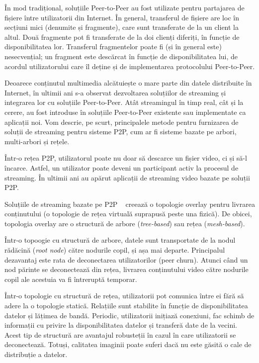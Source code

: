 În mod tradițional, soluțiile Peer-to-Peer au fost utilizate pentru partajarea
de fișiere între utilizatorii din Internet. În general, transferul de fișiere
are loc în secțiuni mici (denumite și fragmente), care sunt transferate de
la un client la altul. Două fragmente pot fi transferate de la doi clienți
diferiți, în funcție de disponibilitatea lor. Transferul fragmentelor poate fi
(și în general este) nesecvențial; un fragment este descărcat în funcție de
disponibilitatea lui, de acordul utilizatorului care îl deține și de
implementarea protocolului Peer-to-Peer.

Deoarece conținutul multimedia alcătuiește o mare parte din datele distribuite
în Internet, în ultimii ani s-a observat dezvoltarea soluțiilor de streaming
și integrarea lor cu soluțiile Peer-to-Peer. Atât streamingul în timp real,
cât și la cerere, au fost introduse în soluțiile Peer-to-Peer existente sau
implementate ca aplicații noi. Vom descrie, pe scurt, principalele metode
pentru furnizarea de soluții de streaming pentru sisteme P2P, cum ar fi
sisteme bazate pe arbori, multi-arbori și rețele.

Într-o rețea P2P, utilizatorul poate nu doar să descarce un fișier video,
ci și să-l încarce. Astfel, un utilizator poate deveni un participant activ
la procesul de streaming. În ultimii ani au apărut aplicații de streaming video
bazate pe soluții P2P.

Soluțiile de streaming bazate pe P2P ~\cite{p2p-streaming-survey} creează o
topologie overlay pentru livrarea conținutului (o topologie de rețea virtuală
suprapusă peste una fizică). De obicei, topologia overlay are o structură
de arbore (\textit{tree-based}) sau rețea (\textit{mesh-based}).

Într-o topoogie cu structură de arbore, datele sunt transportate de la nodul
rădăcină (\textit{root node}) către nodurile copil, și așa mai departe.
Principalul dezavantaj este rata de deconectarea utilizatorilor (peer churn).
Atunci când un nod părinte se deconectează din rețea, livrarea conținutului
video către nodurile copil ale acestuia va fi întreruptă temporar.

Într-o topologie cu structură de rețea, utilizatorii pot comunica între ei
fără să adere la o topologie statică. Relațiile sunt stabilite în funcție de
disponibilitatea datelor și lățimea de bandă. Periodic, utilizatorii inițiază
conexiuni, fac schimb de informații cu privire la disponibilitatea datelor și
transferă date de la vecini. Acest tip de structură are avantajul robusteții
în cazul în care utilizatorii se deconectează. Totuși, calitatea imaginii poate
suferi dacă nu este găsită o cale de distribuție a datelor.

